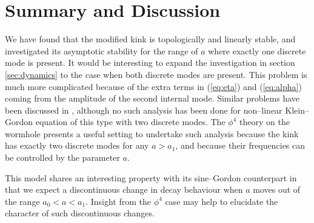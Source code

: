 \section{Summary and Discussion}

We have found that the modified kink is topologically and linearly stable, and investigated its asymptotic stability for the range of $a$ where exactly one discrete mode is present. It would be interesting to expand the investigation in section \ref{sec:dynamics} to the case when both discrete modes are present. This problem is much more complicated because of the extra terms in (\ref{eq:eta}) and (\ref{eq:alpha}) coming from the amplitude of the second internal mode. Similar problems have been discussed in \cite{Weinstein}, although no such analysis has been done for non--linear Klein--Gordon equation of this type with two discrete modes. The $\phi^4$ theory on the wormhole presents a useful setting to undertake such analysis because the kink has exactly two discrete modes for any $a>a_1$, and because their frequencies can be controlled by the parameter $a$.

This model shares an interesting property with its sine--Gordon counterpart in that we expect a discontinuous change in decay behaviour when $a$ moves out of the range $a_0<a<a_1$. Insight from the $\phi^4$ case may help to elucidate the character of such discontinuous changes.

 


